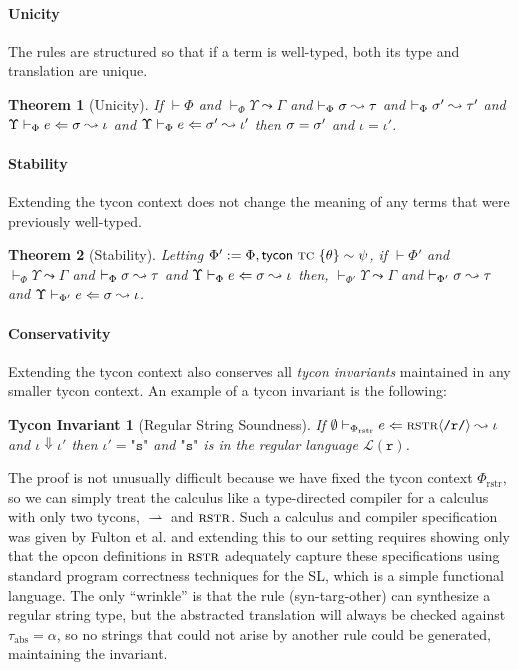 \documentclass[10pt,preprint]{sigplanconf}
\newtheorem{theorem}{Theorem}
\newtheorem{tyconinvariant}{Tycon Invariant}
\newenvironment{proof-sketch}{\noindent{\emph{Proof Sketch.}}}{\qed}
\begin{document}
\paragraph{Unicity}
The rules are structured so that if a term is well-typed, both its type and translation are unique.
\begin{theorem}[Unicity]
If $\vdash \Phi$ and $\vdash_\Phi \Upsilon \leadsto \Gamma$ and $\vdash_\Phi \sigma \leadsto \tau$ and $\vdash_\Phi \sigma' \leadsto \tau'$ and $\Upsilon \vdash_{\Phi} e \Leftarrow \sigma \leadsto \iota$ and $\Upsilon \vdash_{\Phi} e \Leftarrow \sigma' \leadsto \iota'$ then $\sigma = \sigma'$ and $\iota = \iota'$.
\end{theorem}

\paragraph{Stability}
Extending the tycon context does not change the meaning of any terms that were previously well-typed.
\begin{theorem}[Stability]
Letting $\Phi' := \Phi, {\sf tycon}~\textsc{tc} ~\{\theta\} \sim \psi$, if $\vdash \Phi'$ and $\vdash_\Phi \Upsilon \leadsto \Gamma$ and $\vdash_\Phi \sigma \leadsto \tau$ and $\Upsilon \vdash_{\Phi} e \Leftarrow \sigma \leadsto \iota$ then, $\vdash_{\Phi'} \Upsilon \leadsto \Gamma$ and $\vdash_{\Phi'} \sigma \leadsto \tau$ and $\Upsilon \vdash_{\Phi'} e \Leftarrow \sigma \leadsto \iota$.
\end{theorem}

\paragraph{Conservativity} 
Extending the tycon context also conserves all \emph{tycon invariants} maintained in any smaller tycon context. An example of a tycon invariant is the following:

\begin{tyconinvariant}[Regular String Soundness]
If $\emptyset \vdash_{\Phi_\text{rstr}} e \Leftarrow {\textsc{rstr}}\langle\texttt{/r/}\rangle \leadsto \iota$ and $\iota \Downarrow \iota'$ then $\iota'=\texttt{"s"}$ and $\texttt{"s"}$ is in the regular language $\mathcal{L}(\texttt{r})$.
\end{tyconinvariant}
\begin{proof-sketch} The proof is not unusually difficult because we have fixed the tycon context $\Phi_\text{rstr}$, so we can simply treat the calculus like a type-directed compiler for a calculus with only two tycons, $\rightharpoonup$ and $\textsc{rstr}$. Such a calculus and compiler specification was given by Fulton et al. \cite{sanitation-psp14} and extending this to our  setting requires showing only that the opcon definitions in $\textsc{rstr}$ adequately capture these specifications using standard program correctness techniques for the SL, which is a simple functional language. The only ``wrinkle'' is that the rule (syn-targ-other) can synthesize a regular string type, but the abstracted translation will always be checked against $\tau_\text{abs}=\alpha$, so no strings that could not arise by another rule could  be generated, maintaining the invariant. \end{proof-sketch}
\end{document}
